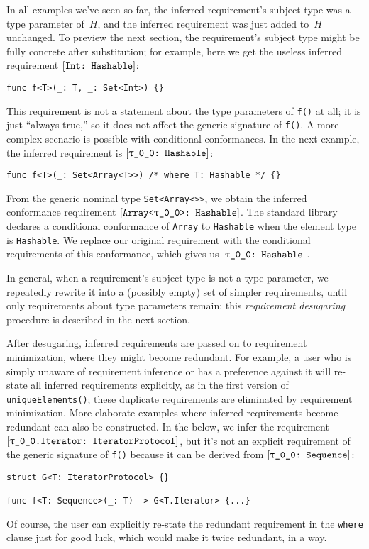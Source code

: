 \documentclass[../generics]{subfiles}
\begin{document}
In all examples we've seen so far, the inferred requirement's subject type was a type parameter of~$H$, and the inferred requirement was just added to~$H$ unchanged. To preview the next section, the requirement's subject type might be fully concrete after substitution; for example, here we get the useless inferred requirement $[\texttt{Int:~Hashable}]$:
\begin{Verbatim}
func f<T>(_: T, _: Set<Int>) {}
\end{Verbatim}
This requirement is not a statement about the type parameters of \texttt{f()} at all; it is just ``always true,'' so it does not affect the generic signature of \texttt{f()}. A more complex scenario is possible with conditional conformances. In the next example, the inferred requirement is $[\texttt{\texttt{$\uptau$\_0\_0}:~Hashable}]$:
\begin{Verbatim}
func f<T>(_: Set<Array<T>>) /* where T: Hashable */ {}
\end{Verbatim}
From the generic nominal type \texttt{Set<Array<\rT>>}, we obtain the inferred conformance requirement $[\texttt{Array<\texttt{$\uptau$\_0\_0}>:~Hashable}]$. The standard library declares a conditional conformance of \texttt{Array} to \texttt{Hashable} when the element type is \texttt{Hashable}. We replace our original requirement with the conditional requirements of this conformance, which gives us $[\texttt{\texttt{$\uptau$\_0\_0}:~Hashable}]$.

In general, when a requirement's subject type is not a type parameter, we repeatedly rewrite it into a (possibly empty) set of simpler requirements, until only requirements about type parameters remain; this \emph{requirement desugaring} procedure is described in the next section.

After desugaring, inferred requirements are passed on to requirement minimization, where they might become redundant. For example, a user who is simply unaware of requirement inference or has a preference against it will re-state all inferred requirements explicitly, as in the first version of \texttt{uniqueElements()}; these duplicate requirements are eliminated by requirement minimization. More elaborate examples where inferred requirements become redundant can also be constructed. In the below, we infer the requirement $[\texttt{\texttt{$\uptau$\_0\_0}.Iterator:~IteratorProtocol}]$, but it's not an explicit requirement of the generic signature of \texttt{f()} because it can be derived from $[\texttt{\texttt{$\uptau$\_0\_0}:~Sequence}]$:
\begin{Verbatim}
struct G<T: IteratorProtocol> {}

func f<T: Sequence>(_: T) -> G<T.Iterator> {...}
\end{Verbatim}
Of course, the user can explicitly re-state the redundant requirement in the \texttt{where} clause just for good luck, which would make it twice redundant, in a way.
\end{document}
